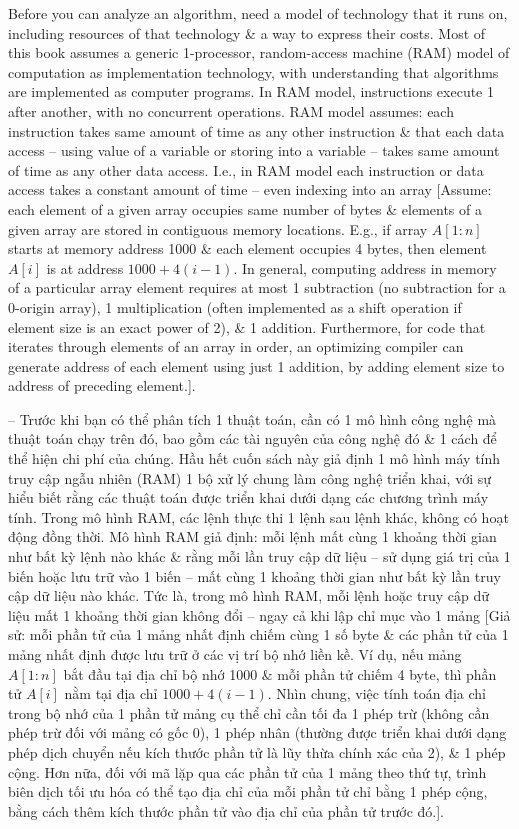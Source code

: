 \documentclass{article}
\begin{document}
\begin{itemize}
\begin{itemize}
\begin{itemize}
            Before you can analyze an algorithm, need a model of technology that it runs on, including resources of that technology \& a way to express their costs. Most of this book assumes a generic 1-processor, random-access machine (RAM) model of computation as implementation technology, with understanding that algorithms are implemented as computer programs. In RAM model, instructions execute 1 after another, with no concurrent operations. RAM model assumes: each instruction takes same amount of time as any other instruction \& that each data access -- using value of a variable or storing into a variable -- takes same amount of time as any other data access. I.e., in RAM model each instruction or data access takes a constant amount of time -- even indexing into an array [Assume: each element of a given array occupies same number of bytes \& elements of a given array are stored in contiguous memory locations. E.g., if array $A[1:n]$ starts at memory address 1000 \& each element occupies 4 bytes, then element $A[i]$ is at address $1000 + 4(i - 1)$. In general, computing address in memory of a particular array element requires at most 1 subtraction (no subtraction for a 0-origin array), 1 multiplication (often implemented as a shift operation if element size is an exact power of 2), \& 1 addition. Furthermore, for code that iterates through elements of an array in order, an optimizing compiler can generate address of each element using just 1 addition, by adding element size to address of preceding element.].
            
            -- Trước khi bạn có thể phân tích 1 thuật toán, cần có 1 mô hình công nghệ mà thuật toán chạy trên đó, bao gồm các tài nguyên của công nghệ đó \& 1 cách để thể hiện chi phí của chúng. Hầu hết cuốn sách này giả định 1 mô hình máy tính truy cập ngẫu nhiên (RAM) 1 bộ xử lý chung làm công nghệ triển khai, với sự hiểu biết rằng các thuật toán được triển khai dưới dạng các chương trình máy tính. Trong mô hình RAM, các lệnh thực thi 1 lệnh sau lệnh khác, không có hoạt động đồng thời. Mô hình RAM giả định: mỗi lệnh mất cùng 1 khoảng thời gian như bất kỳ lệnh nào khác \& rằng mỗi lần truy cập dữ liệu -- sử dụng giá trị của 1 biến hoặc lưu trữ vào 1 biến -- mất cùng 1 khoảng thời gian như bất kỳ lần truy cập dữ liệu nào khác. Tức là, trong mô hình RAM, mỗi lệnh hoặc truy cập dữ liệu mất 1 khoảng thời gian không đổi -- ngay cả khi lập chỉ mục vào 1 mảng [Giả sử: mỗi phần tử của 1 mảng nhất định chiếm cùng 1 số byte \& các phần tử của 1 mảng nhất định được lưu trữ ở các vị trí bộ nhớ liền kề. Ví dụ, nếu mảng $A[1:n]$ bắt đầu tại địa chỉ bộ nhớ 1000 \& mỗi phần tử chiếm 4 byte, thì phần tử $A[i]$ nằm tại địa chỉ $1000 + 4(i - 1)$. Nhìn chung, việc tính toán địa chỉ trong bộ nhớ của 1 phần tử mảng cụ thể chỉ cần tối đa 1 phép trừ (không cần phép trừ đối với mảng có gốc 0), 1 phép nhân (thường được triển khai dưới dạng phép dịch chuyển nếu kích thước phần tử là lũy thừa chính xác của 2), \& 1 phép cộng. Hơn nữa, đối với mã lặp qua các phần tử của 1 mảng theo thứ tự, trình biên dịch tối ưu hóa có thể tạo địa chỉ của mỗi phần tử chỉ bằng 1 phép cộng, bằng cách thêm kích thước phần tử vào địa chỉ của phần tử trước đó.].
            

\end{itemize}
\end{itemize}
\end{itemize}
\end{document}
